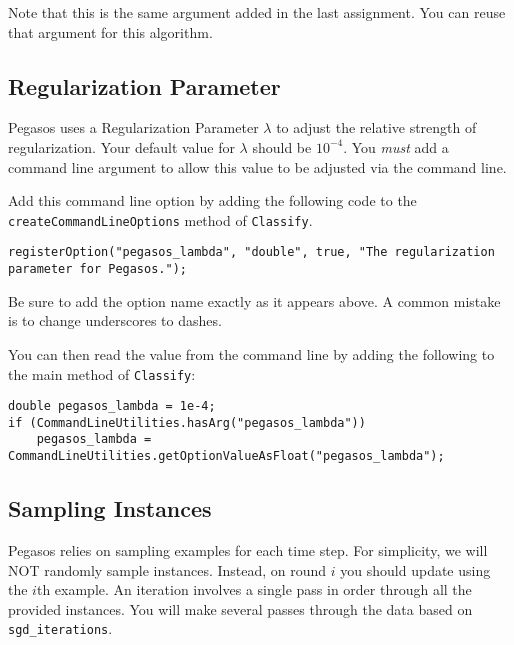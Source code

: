 \documentclass[11pt]{article}
\newcommand{\code}[1]{{\footnotesize \tt #1}}
\begin{document}
Note that this is the same argument added in the last assignment. You can reuse that argument for this algorithm.

\subsection{Regularization Parameter}
Pegasos uses a Regularization Parameter $\lambda$ to adjust the relative strength of regularization. Your default value for $\lambda$ should be $10^{-4}$. You \emph{must} add a command line argument to allow this value to be adjusted via the command line.

Add this command line option by adding the following code to the \code{createCommandLineOptions} method of \code{Classify}.
\begin{footnotesize}
\begin{verbatim}
registerOption("pegasos_lambda", "double", true, "The regularization parameter for Pegasos.");
\end{verbatim}
\end{footnotesize}

Be sure to add the option name exactly as it appears above. A common mistake is to change underscores to dashes.

You can then read the value from the command line by adding the following to the main method of \code{Classify}:
\begin{footnotesize}
\begin{verbatim}
double pegasos_lambda = 1e-4;
if (CommandLineUtilities.hasArg("pegasos_lambda"))
    pegasos_lambda = CommandLineUtilities.getOptionValueAsFloat("pegasos_lambda");
\end{verbatim}
\end{footnotesize}

\subsection{Sampling Instances}
\label{sec:random}
Pegasos relies on sampling examples for each time step. For simplicity, we will NOT randomly sample instances. Instead, on round $i$ you should update using the $i$th example. An iteration involves a single pass in order through all the provided instances. You will make several passes through the data based on {\tt sgd\_iterations}.
\end{document}
